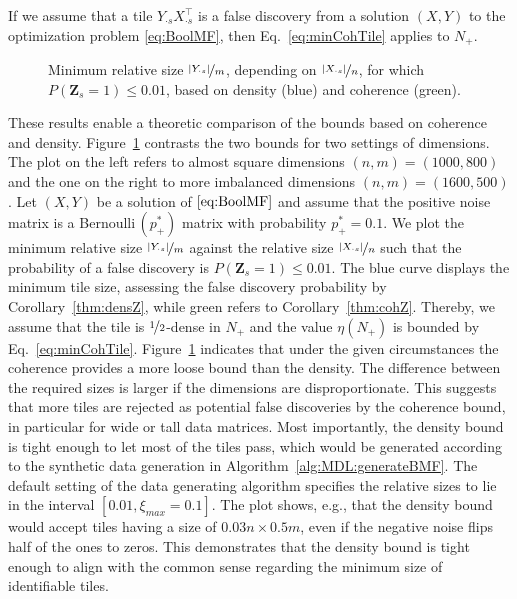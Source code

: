 %
If we assume that a tile $Y_{\cdot s}X_{\cdot s}^\top$ is a false discovery from a solution $(X,Y)$ to the optimization problem \eqref{eq:BoolMF}, then Eq.~\eqref{eq:minCohTile} applies to $N_+$.
\begin{figure}
\centering

\caption{Minimum relative size $\nicefrac{\lvert Y_{\cdot s}\rvert }{m}$, depending on $\nicefrac{\lvert X_{\cdot s}\rvert }{n}$, for which $P(\mathbf{Z}_s=1)\leq 0.01$, based on density (blue) and coherence (green).}
\label{fig:theory}
\end{figure}

These results enable a theoretic comparison of the bounds based on coherence and density. Figure~\ref{fig:theory} contrasts the two bounds for two settings of dimensions. The plot on the left refers to almost square dimensions $(n,m)=(1000,800)$ and the one on the right to more imbalanced dimensions $(n,m)=(1600,500)$. Let $(X,Y)$ be a solution of $\eqref{eq:BoolMF}$ and assume that the positive noise matrix is a Bernoulli$\,(p_+^*)$ matrix with probability $p_+^*=0.1$. We plot the minimum relative size $\nicefrac{\lvert Y_{\cdot s}\rvert }{m}$ against the relative size $\nicefrac{\lvert X_{\cdot s}\rvert }{n}$ such that the probability of a false discovery is $P(\mathbf{Z}_s=1)\leq 0.01$. The blue curve displays the minimum tile size, assessing the false discovery probability by Corollary~\ref{thm:densZ}, while green refers to Corollary~\ref{thm:cohZ}. Thereby, we assume that the tile is $\nicefrac{1}{2}$-dense in $N_+$ and the value $\eta(N_+)$ is bounded by Eq.~\eqref{eq:minCohTile}. Figure~\ref{fig:theory} indicates that under the given circumstances the coherence provides a more loose bound than the density. The difference between the required sizes is larger if the dimensions are disproportionate. This suggests that more tiles are rejected as potential false discoveries by the coherence bound, in particular for wide or tall data matrices. Most importantly, the density bound is tight enough to let most of the tiles pass, which would be generated according to the synthetic data generation in Algorithm~\ref{alg:MDL:generateBMF}. The default setting of the data generating algorithm specifies the relative sizes to lie in the interval $[0.01,\xi_{max}=0.1]$. The plot shows, e.g., that the density bound would accept tiles having a size of $0.03n\times 0.5m$, even if the negative noise flips half of the ones to zeros. This demonstrates that the density bound is tight enough to align with the common sense regarding the minimum size of identifiable tiles.   
